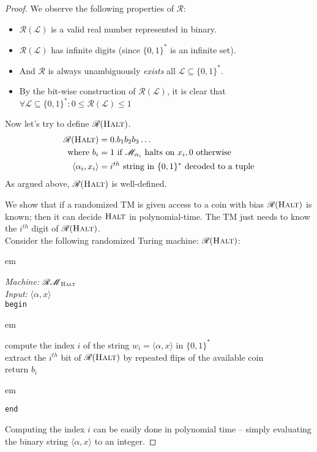 \documentclass[usletter]{article}
\newcommand {\langset}[1]      {\ensuremath{\mathcal{#1}}}
\newcommand {\machine}[1]      {\ensuremath{\mathscr{#1}}}
\newcommand {\namedlangset}[1] {\ensuremath{\textnormal{\textsc{#1}}}}
\newcommand {\indpar}[1]   {
  \par\leftskip=#1em
  \noindent\ignorespaces
}
\newenvironment{turing}[2] {
  \smallskip
  \indpar{2}
  \textit{Machine:} #1\\
  \textit{Input:} $#2$\\[5pt]
  \texttt{begin}
  \parskip=0pt
  \indpar{3}
}{
  \indpar{2}
  \texttt{end}
  \par\medskip
}
\newcommand {\langL}          {\langset{L}}
\newcommand {\machineM}       {\machine{M}}
\begin{document}
\begin{enumerate}[labelsep=2.5em, label=\textbf{\arabic{enumi}}]
\begin{proof}
    We observe the following properties of \machine{R}:
    \begin{itemize}
      \item $\machine{R}(\langL)$ is a valid real number represented in binary.
      \item $\machine{R}(\langL)$ has infinite digits (since $\{0,1\}^*$ is an
            infinite set).
      \item And \machine{R} is always unambiguously \textit{exists} all
            $\langL \subseteq \{0,1\}^*$.
      \item By the bit-wise construction of $\machine{R}(\langL)$, it is clear
            that $\forall \langL \subseteq \{0,1\}^* :
            0 \leq \machine{R}(\langL) \leq 1$
    \end{itemize}

    Now let's try to define $\machine{R}(\namedlangset{Halt})$.
    \begin{align*}
      \machine{R}(\namedlangset{Halt}) &= 0. b_1 b_2 b_3 \ldots \\
      \text{where } b_i &= 1 \text{ if } \machineM_{\alpha_i}
        \text{ halts on } x_i, 0 \text{ otherwise} \\
      \langle \alpha_i, x_i \rangle &= i^{th} \text{ string in } \{0,1\}^*
        \text{ decoded to a tuple}
    \end{align*}
    As argued above, $\machine{R}(\namedlangset{Halt})$ is well-defined.

    We show that if a randomized TM is given access to a coin with bias
    $\machine{R}(\namedlangset{Halt})$ is known; then it can decide
    \namedlangset{Halt} in polynomial-time. The TM just needs to know the
    $i^{th}$ digit of $\machine{R}(\namedlangset{Halt})$. \\
    Consider the following randomized Turing machine:
    $\machine{R}(\namedlangset{Halt})$:
    \begin{turing}{$\machine{RM}_\namedlangset{Halt}$}
                  {\langle \alpha, x \rangle}
      compute the index $i$ of the string $w_i = \langle \alpha, x \rangle$ in
        $\{0,1\}^*$ \\
      extract the $i^{th}$ bit of $\machine{R}(\namedlangset{Halt})$ by repeated
        flips of the available coin \\
      return $b_i$
    \end{turing}
    Computing the index $i$ can be easily done in polynomial time -- simply
    evaluating the binary string $\langle \alpha, x \rangle$ to an integer.


\end{proof}
\end{enumerate}
\end{document}
